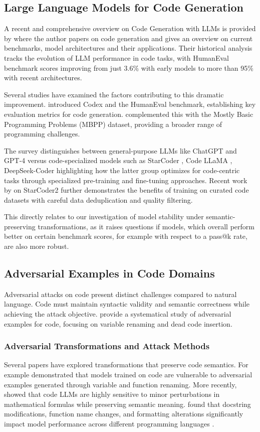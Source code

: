 \documentclass[%
thesis=student,%
coverpage=false,%
titlepage=false,%
headmarks=true, %
english,%
font=libertine, %
math=newpxtx, %
BCOR=5mm,%
coverBCOR=11mm%
]{tum-templates/book/tumbook}
\begin{document}
\subsection{Large Language Models for Code Generation}

A recent and comprehensive overview on Code Generation with LLMs is provided by \textcite{Jiang2024} where the author papers on code generation and gives an overview on current benchmarks, model architectures and their applications. Their historical analysis tracks the evolution of LLM performance in code tasks, with HumanEval benchmark scores improving from just 3.6\% with early models to more than 95\% with recent architectures. 

Several studies have examined the factors contributing to this dramatic improvement. \textcite{Chen2021} introduced Codex and the HumanEval benchmark, establishing key evaluation metrics for code generation. \textcite{Austin2021} complemented this with the Mostly Basic Programming Problems (MBPP) dataset, providing a broader range of programming challenges. 

The survey distinguishes between general-purpose LLMs like ChatGPT and GPT-4 versus code-specialized models such as StarCoder \cite{Li2023}, Code LLaMA \cite{Roziere2023}, DeepSeek-Coder \cite{Guo2024} highlighting how the latter group optimizes for code-centric tasks through specialized pre-training and fine-tuning approaches. Recent work by \textcite{Lozhkov2024} on StarCoder2 further demonstrates the benefits of training on curated code datasets with careful data deduplication and quality filtering.

This directly relates to our investigation of model stability under semantic-preserving transformations, as it raises questions if models, which overall perform better on certain benchmark scores, for example with respect to a pass@k rate, are also more robust.


\subsection{Adversarial Examples in Code Domains}
Adversarial attacks on code present distinct challenges compared to natural language. Code must maintain syntactic validity and semantic correctness while achieving the attack objective. \textcite{Zhang2019} provide a systematical study of adversarial examples for code, focusing on variable renaming and dead code insertion.
\subsubsection{Adversarial Transformations and Attack Methods}
Several papers have explored transformations that preserve code semantics. For example \textcite{Yefet2020} demonstrated that models trained on code are vulnerable to adversarial examples generated through variable and function renaming.
More recently, \textcite{Sarker2024} showed that code LLMs are highly sensitive to minor perturbations in mathematical formulas while preserving semantic meaning. \textcite{Rabbi2024} found that docstring modifications, function name changes, and formatting alterations significantly impact model performance across different programming languages \cite{Rabbi2024}.
\end{document}
